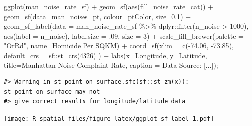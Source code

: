 \documentclass[
  11pt,
]{book}
\newenvironment{Shaded}{\begin{snugshade}}{\end{snugshade}}
\newcommand{\AttributeTok}[1]{\textcolor[rgb]{0.77,0.63,0.00}{#1}}
\newcommand{\DecValTok}[1]{\textcolor[rgb]{0.00,0.00,0.81}{#1}}
\newcommand{\FloatTok}[1]{\textcolor[rgb]{0.00,0.00,0.81}{#1}}
\newcommand{\FunctionTok}[1]{\textcolor[rgb]{0.00,0.00,0.00}{#1}}
\newcommand{\NormalTok}[1]{#1}
\newcommand{\SpecialCharTok}[1]{\textcolor[rgb]{0.00,0.00,0.00}{#1}}
\newcommand{\StringTok}[1]{\textcolor[rgb]{0.31,0.60,0.02}{#1}}
\begin{document}
\begin{Shaded}
\begin{Highlighting}[]
\FunctionTok{ggplot}\NormalTok{(man\_noise\_rate\_sf) }\SpecialCharTok{+} 
  \FunctionTok{geom\_sf}\NormalTok{(}\FunctionTok{aes}\NormalTok{(}\AttributeTok{fill=}\NormalTok{noise\_rate\_cat)) }\SpecialCharTok{+}
  \FunctionTok{geom\_sf}\NormalTok{(}\AttributeTok{data=}\NormalTok{man\_noises\_pt, }\AttributeTok{colour=}\NormalTok{ptColor, }\AttributeTok{size=}\FloatTok{0.1}\NormalTok{) }\SpecialCharTok{+}
  \FunctionTok{geom\_sf\_label}\NormalTok{(}\AttributeTok{data =}\NormalTok{ man\_noise\_rate\_sf }\SpecialCharTok{\%\textgreater{}\%}\NormalTok{ dplyr}\SpecialCharTok{::}\FunctionTok{filter}\NormalTok{(n\_noise }\SpecialCharTok{\textgreater{}} \DecValTok{1000}\NormalTok{),}
                \FunctionTok{aes}\NormalTok{(}\AttributeTok{label =}\NormalTok{ n\_noise),}
                \AttributeTok{label.size =}\NormalTok{ .}\DecValTok{09}\NormalTok{,}
                \AttributeTok{size =} \DecValTok{3}\NormalTok{) }\SpecialCharTok{+}
  \FunctionTok{scale\_fill\_brewer}\NormalTok{(}\AttributeTok{palette =} \StringTok{"OrRd"}\NormalTok{, }\AttributeTok{name=}\StringTok{\textquotesingle{}Homicide Per SQKM\textquotesingle{}}\NormalTok{) }\SpecialCharTok{+}
  \FunctionTok{coord\_sf}\NormalTok{(}\AttributeTok{xlim =} \FunctionTok{c}\NormalTok{(}\SpecialCharTok{{-}}\FloatTok{74.06}\NormalTok{, }\SpecialCharTok{{-}}\FloatTok{73.85}\NormalTok{), }\AttributeTok{default\_crs =}\NormalTok{ sf}\SpecialCharTok{::}\FunctionTok{st\_crs}\NormalTok{(}\DecValTok{4326}\NormalTok{) ) }\SpecialCharTok{+}
  \FunctionTok{labs}\NormalTok{(}\AttributeTok{x=}\StringTok{\textquotesingle{}Longitude\textquotesingle{}}\NormalTok{, }\AttributeTok{y=}\StringTok{\textquotesingle{}Latitude\textquotesingle{}}\NormalTok{, }
       \AttributeTok{title=}\StringTok{\textquotesingle{}Manhattan Noise Complaint Rate\textquotesingle{}}\NormalTok{,}
       \AttributeTok{caption =} \StringTok{\textquotesingle{}Data Source: [...]\textquotesingle{}}\NormalTok{);}
\end{Highlighting}
\end{Shaded}

\begin{verbatim}
#> Warning in st_point_on_surface.sfc(sf::st_zm(x)): st_point_on_surface may not
#> give correct results for longitude/latitude data
\end{verbatim}

\texttt{[image: R-spatial\_files/figure-latex/ggplot-sf-label-1.pdf]}
\end{document}
